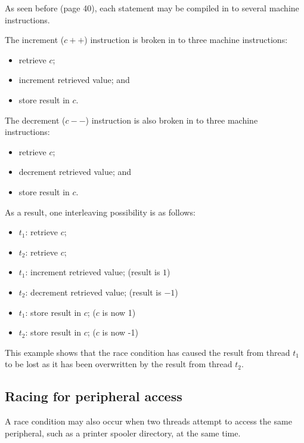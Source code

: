 \documentclass[a4paper]{systems-software}
\begin{document}
As seen before (page 40), each statement may be compiled in to several machine instructions.

The increment ($c++$) instruction is broken in to three machine instructions:
\begin{itemize}
	\item retrieve $c$;
	\item increment retrieved value; and
	\item store result in $c$.
\end{itemize}

The decrement ($c--$) instruction is also broken in to three machine instructions:
\begin{itemize}
	\item retrieve $c$;
	\item decrement retrieved value; and
	\item store result in $c$.
\end{itemize}

As a result, one interleaving possibility is as follows:
\begin{itemize}
	\item $t_{1}$: retrieve $c$;
	\item $t_{2}$: retrieve $c$;
	\item $t_{1}$: increment retrieved value; (result is $1$)
	\item $t_{2}$: decrement retrieved value; (result is $-1$)
	\item $t_{1}$: store result in $c$; ($c$ is now 1)
	\item $t_{2}$: store result in $c$; ($c$ is now -1)
\end{itemize}

This example shows that the race condition has caused the result from thread $t_{1}$ to be lost as it has been overwritten by the result from thread $t_{2}$.


\subsection*{Racing for peripheral access}

A race condition may also occur when two threads attempt to access the same peripheral, such as a printer spooler directory, at the same time.
\end{document}
